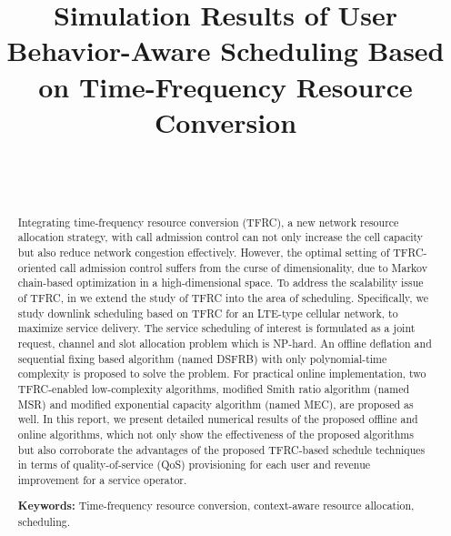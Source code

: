 \documentclass[journal,letterpaper,12pt,oneside,onecolumn,draftclsnofoot]{IEEEtran}
\begin{document}
\title{\Large \bf Simulation Results of User Behavior-Aware Scheduling Based on Time-Frequency Resource Conversion} \author{\small {}\\ \small {}
\\ 

}
\maketitle 
\vspace{-0.30cm}
\begin{abstract}

Integrating time-frequency resource conversion (TFRC), a new network resource allocation strategy, with call admission control can not only increase the cell capacity but also reduce network congestion effectively. However, the optimal setting of TFRC-oriented call admission control suffers from the curse of dimensionality, due to Markov chain-based optimization in a high-dimensional space.
To address the scalability issue of TFRC, in \cite{Shan_TWC_submitted} we extend the study of TFRC into the area of scheduling.
Specifically, we study downlink scheduling based on TFRC for an LTE-type cellular network, to maximize service delivery.
The service scheduling of interest is formulated as a joint request, channel and slot allocation problem which is NP-hard.
An offline deflation and sequential fixing based algorithm (named DSFRB) with only polynomial-time complexity is proposed to solve the problem.
For practical online implementation, two TFRC-enabled low-complexity algorithms, modified Smith ratio algorithm (named MSR) and modified exponential capacity algorithm (named MEC), are proposed as well.
In this report, we present detailed numerical results of the proposed offline and online algorithms, which not only show the effectiveness of the proposed algorithms but also\emph{} corroborate the advantages of the proposed TFRC-based schedule techniques in terms of quality-of-service (QoS) provisioning for each user and revenue improvement for a service operator.


\textbf{Keywords:} Time-frequency resource conversion, context-aware resource allocation, scheduling.
\end{abstract}
\end{document}
